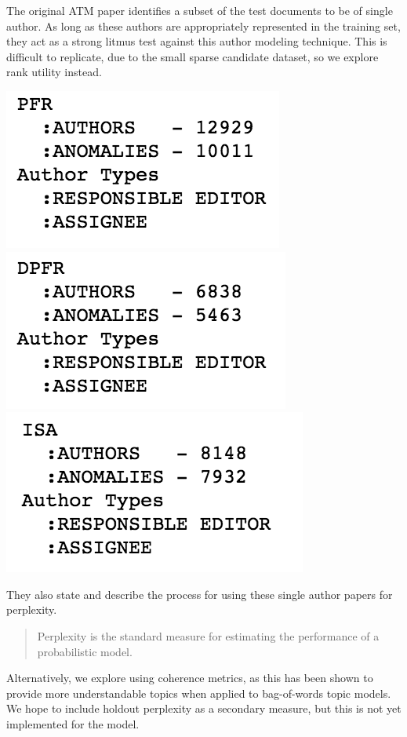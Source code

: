 \documentclass{article}
\begin{document}
\begin{multicols}{2}
The original ATM\cite{RosenZvi2004} paper identifies a subset of the test documents
to be of single author.
As long as these authors are appropriately represented in the training set, they act as
a strong litmus test against this author modeling technique. This is difficult to replicate,
due to the small sparse candidate dataset, so we explore rank utility\cite{Gunawardan,Silveira2017}
instead.

\includegraphics[width=.27\columnwidth]{../images/PFR_count.png}
\includegraphics[width=.27\columnwidth]{../images/DPFR_count.png}
\includegraphics[width=.27\columnwidth]{../images/ISA_count.png}

They\cite{RosenZvi2004}
also state and describe the process for using these single author papers for perplexity.
\begin{quote}
  Perplexity is the standard measure for estimating the performance of a probabilistic model.
\end{quote}
Alternatively, we explore using coherence metrics\cite{Roder2015}, as this has been shown to
provide more understandable topics when applied to bag-of-words topic models. We hope to include
holdout perplexity as a secondary measure, but this is not yet implemented for the model.


\end{multicols}
\end{document}
